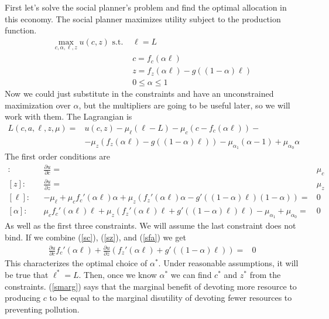 \documentclass[12pt,reqno]{amsart}
\theoremstyle{definition}
\begin{document}
First let's solve the social planner's problem and find the optimal
allocation in this economy. The social planner maximizes utility
subject to the production function.
\begin{align*}
  \max_{c,\alpha,\ell,z} u(c,z) \text{ s.t. } & \ell = L \\
  & c = f_c(\alpha \ell) \\
  & z = f_z(\alpha \ell) - g((1-\alpha)\ell)  \\
  & 0 \leq \alpha \leq 1
\end{align*}
Now we could just substitute in the constraints and have an
unconstrained maximization over $\alpha$, but the multipliers are
going to be useful later, so we will work with them. The Lagrangian is
\begin{align*}
  L(c,a,\ell,z,\mu) = & u(c,z) - \mu_\ell (\ell -L) - \mu_c\left(c-
f_c(\alpha \ell) \right) - \\
& - \mu_z \left(f_z(\alpha \ell) - g((1-\alpha)
\ell) \right) - \mu_{\alpha_1}(\alpha-1) + \mu_{\alpha_0} \alpha 
\end{align*}
The first order conditions are
\begin{align}
  [c]: && \frac{\partial u}{\partial c} = &\mu_c \label{sc}\\
  [z]: && \frac{\partial u}{\partial z} = &\mu_z \label{sz}\\
  [\ell]: && -\mu_\ell + \mu_c f_c'(\alpha \ell) \alpha + \mu_z\left(
    f_z'(\alpha\ell) \alpha - g'((1-\alpha)\ell)(1-\alpha) \right) =& 0
  \label{sl} \\
  [\alpha]: &&  \mu_c f_c'(\alpha \ell) \ell + \mu_z
  \left(f_z'(\alpha\ell) \ell + g'((1-\alpha)\ell) \ell\right) -
  \mu_{\alpha_1} + \mu_{\alpha_0} = & 0 \label{sfa}
\end{align}
As well as the first three constraints. We will assume the last
constraint does not bind. If we combine (\ref{sc}),
(\ref{sz}), and (\ref{sfa}) we get
\begin{align}
  \frac{\partial u}{\partial c} f_c'(\alpha \ell)  + \frac{\partial
    u}{\partial z} \left(f_z'(\alpha\ell) + g'((1-\alpha) \ell)\right) = &
    0 \label{smarg}
  \end{align}
This characterizes the optimal choice of $\alpha^*$. Under reasonable
assumptions, it will be true that $\ell^* = L$.  Then, once we know
$\alpha^*$ we can find $c^*$ and $z^*$ from the
constraints. (\ref{smarg}) says that the marginal benefit of devoting
more resource to producing $c$ to be equal to the marginal disutility
of devoting fewer resources to preventing pollution. 
\end{document}
